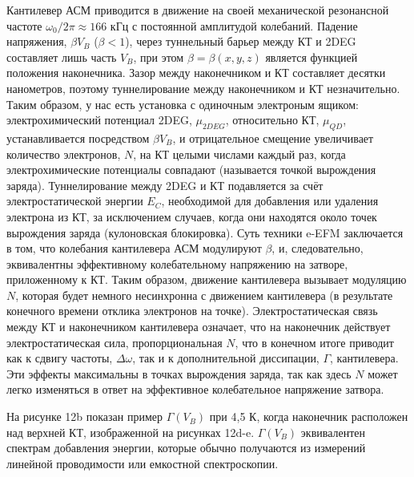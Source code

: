 \documentclass[a4paper,14pt]{extarticle}
\begin{document}
Кантилевер АСМ приводится в движение на своей механической резонансной частоте $\omega_0/2\pi \approx 166$ кГц с постоянной амплитудой колебаний. Падение напряжения, $\beta V_B$ ($\beta < 1$), через туннельный барьер между КТ и 2DEG составляет лишь часть $V_B$, при этом $\beta = \beta(x, y, z)$ является функцией положения наконечника. Зазор между наконечником и КТ составляет десятки нанометров, поэтому туннелирование между наконечником и КТ незначительно. Таким образом, у нас есть установка с одиночным электроным ящиком: электрохимический потенциал 2DEG, $\mu_{2DEG}$, относительно КТ, $\mu_{QD}$, устанавливается посредством $\beta V_B$, и отрицательное смещение увеличивает количество электронов, $N$, на КТ целыми числами каждый раз, когда электрохимические потенциалы совпадают (называется точкой вырождения заряда). Туннелирование между 2DEG и КТ подавляется за счёт электростатической энергии $E_C$, необходимой для добавления или удаления электрона из КТ, за исключением случаев, когда они находятся около точек вырождения заряда (кулоновская блокировка). Суть техники e-EFM заключается в том, что колебания кантилевера АСМ модулируют $\beta$, и, следовательно, эквивалентны эффективному колебательному напряжению на затворе, приложенному к КТ. Таким образом, движение кантилевера вызывает модуляцию $N$, которая будет немного несинхронна с движением кантилевера (в результате конечного времени отклика электронов на точке). Электростатическая связь между КТ и наконечником кантилевера означает, что на наконечник действует электростатическая сила, пропорциональная $N$, что в конечном итоге приводит как к сдвигу частоты, $\Delta \omega$, так и к дополнительной диссипации, $\Gamma$, кантилевера. Эти эффекты максимальны в точках вырождения заряда, так как здесь $N$ может легко изменяться в ответ на эффективное колебательное напряжение затвора.

На рисунке 12b показан пример $\Gamma(V_B)$ при 4,5 К, когда наконечник расположен над верхней КТ, изображенной на рисунках 12d-e. $\Gamma(V_B)$ эквивалентен спектрам добавления энергии, которые обычно получаются из измерений линейной проводимости или емкостной спектроскопии.
\end{document}
